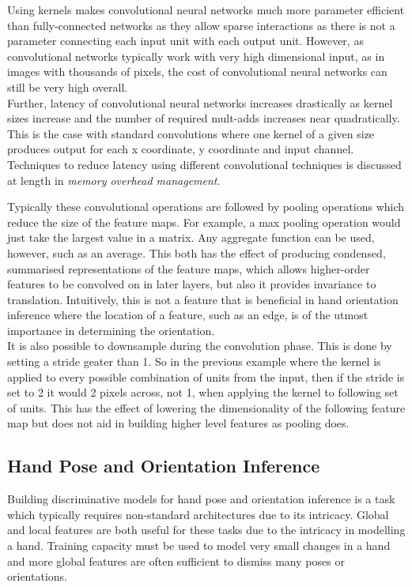 \documentclass{article}
\begin{document}
Using kernels makes convolutional neural networks much more parameter efficient than fully-connected networks as they allow sparse interactions as there is not a parameter connecting each input unit with each output unit. However, as convolutional networks typically work with very high dimensional input, as in images with thousands of pixels, the cost of convolutional neural networks can still be very high overall. \\

Further, latency of convolutional neural networks increases drastically as kernel sizes increase and the number of required mult-adds increases near quadratically. This is the case with standard convolutions where one kernel of a given size produces output for each x coordinate, y coordinate and input channel. Techniques to reduce latency using different convolutional techniques is discussed at length in \emph{memory overhead management}.

Typically these convolutional operations are followed by pooling operations which reduce the size of the feature maps. For example, a max pooling operation would just take the largest value in a matrix. Any aggregate function can be used, however, such as an average. This both has the effect of producing condensed, summarised representations of the feature maps, which allows higher-order features to be convolved on in later layers, but also it provides invariance to translation. Intuitively, this is not a feature that is beneficial in hand orientation inference where the location of a feature, such as an edge, is of the utmost importance in determining the orientation. \\

It is also possible to downsample during the convolution phase. This is done by setting a stride geater than 1. So in the previous example where the kernel is applied to every possible combination of units from the input, then if the stride is set to 2 it would 2 pixels across, not 1, when applying the kernel to following set of units. This has the effect of lowering the dimensionality of the following feature map but does not aid in building higher level features as pooling does.

\subsection*{Hand Pose and Orientation Inference}
Building discriminative models for hand pose and orientation inference is a task which typically requires non-standard architectures due to its intricacy. Global and local features are both useful for these tasks due to the intricacy in modelling a hand. Training capacity must be used to model very small changes in a hand and more global features are often sufficient to dismiss many poses or orientations.\\
\end{document}
